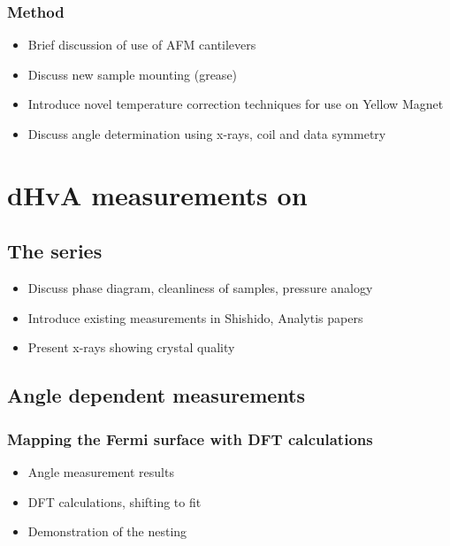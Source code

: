 \documentclass[11pt, a4paper]{article}
\begin{document}
        \subsubsection{Method}
        \begin{itemize}
            \item Brief discussion of use of AFM cantilevers
            \item Discuss new sample mounting (grease)
            \item Introduce novel temperature correction techniques for use on Yellow Magnet
            \item Discuss angle determination using x-rays, coil and data symmetry
        \end{itemize}


\section{dHvA measurements on \BaFeP{}}

    \subsection{The \BaFeAsP{} series}
        \begin{itemize}
            \item Discuss phase diagram, cleanliness of samples, pressure analogy
            \item Introduce existing measurements in Shishido, Analytis papers
            \item Present x-rays showing crystal quality
        \end{itemize}

    \subsection{Angle dependent measurements}
        \subsubsection{Mapping the Fermi surface with DFT calculations}
            \begin{itemize}
                \item Angle measurement results
                \item DFT calculations, shifting to fit
                \item Demonstration of the nesting 
            \end{itemize}
\end{document}
